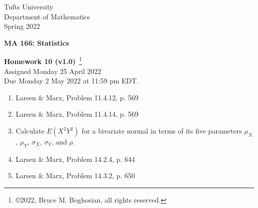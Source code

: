 \documentclass [12pt] {article}
\begin{document}
\thispagestyle{empty}
\begin{center}
Tufts University\\
Department of Mathematics\\
Spring 2022 \\
\end{center}
\begin{center}
{\bf MA 166: Statistics}\\
\end{center}
\begin{center}
{\bf\Large Homework 10 {\small (v1.0)}}~\footnote{\copyright 2022, Bruce M. Boghosian, all rights reserved.}\\
Assigned Monday 25 April 2022\\
Due Monday 2 May 2022 at 11:59 pm EDT.
\end{center}

\begin{enumerate}

\item Larsen \& Marx, Problem 11.4.12, p. 569

\item Larsen \& Marx, Problem 11.4.14, p. 569

\item Calculate $E(X^2Y^2)$ for a bivariate normal in terms of its five parameters $\mu_X$, $\mu_Y$, $\sigma_X$, $\sigma_Y$, and $\rho$.

\item Larsen \& Marx, Problem 14.2.4, p. 644

\item Larsen \& Marx, Problem 14.3.2, p. 650

\end{enumerate}
\end{document}
